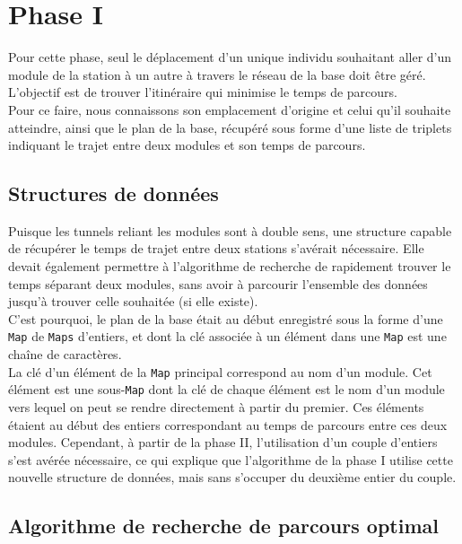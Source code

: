 \documentclass[11pt, a4paper, twoside, titlepage]{article}
\begin{document}
\newpage

\section{Phase I}

Pour cette phase, seul le déplacement d'un unique individu souhaitant aller d'un module de la station à un autre à travers le réseau de la base doit être géré. L'objectif est de trouver l'itinéraire qui minimise le temps de parcours.\\
Pour ce faire, nous connaissons son emplacement d'origine et celui qu'il souhaite atteindre, ainsi que le plan de la base, récupéré sous forme d'une liste de triplets indiquant le trajet entre deux modules et son temps de parcours.\\


\subsection{Structures de données}

Puisque les tunnels reliant les modules sont à double sens, une structure capable de récupérer le temps de trajet entre deux stations s'avérait nécessaire. Elle devait également permettre à l'algorithme de recherche de rapidement trouver le temps séparant deux modules, sans avoir à parcourir l'ensemble des données jusqu'à trouver celle souhaitée (si elle existe).\\
C'est pourquoi, le plan de la base était au début enregistré sous la forme d'une \texttt{Map} de \texttt{Maps} d'entiers, et dont la clé associée à un élément dans une \texttt{Map} est une chaîne de caractères.\\

La clé d'un élément de la \texttt{Map} principal correspond au nom d'un module. Cet élément est une sous-\texttt{Map} dont la clé de chaque élément est le nom d'un module vers lequel on peut se rendre directement à partir du premier. Ces éléments étaient au début des entiers correspondant au temps de parcours entre ces deux modules. Cependant, à partir de la phase II, l'utilisation d'un couple d'entiers s'est avérée nécessaire, ce qui explique que l'algorithme de la phase I utilise cette nouvelle structure de données, mais sans s'occuper du deuxième entier du couple.\\


\subsection{Algorithme de recherche de parcours optimal}
\end{document}
